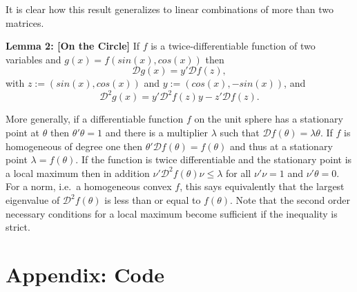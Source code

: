 \documentclass[
  12pt,
]{article}
\begin{document}
It is clear how this result generalizes to linear combinations of more than two matrices.

\textbf{Lemma 2: {[}On the Circle{]}} If \(f\) is a twice-differentiable function of two variables and \(g(x)=f(sin(x),cos(x))\) then
\[
\mathcal{D}g(x)=y'\mathcal{D}f(z),
\]
with \(z:=(sin(x),cos(x))\) and \(y:=(cos(x),-sin(x))\), and
\[
\mathcal{D}^2g(x)=y'\mathcal{D}^2f(z)y-z'\mathcal{D}f(z).
\]

More generally, if a differentiable function \(f\) on the unit sphere has a stationary point at \(\theta\) then \(\theta'\theta=1\) and there is a multiplier \(\lambda\) such that \(\mathcal{D}f(\theta)=\lambda\theta\). If \(f\) is homogeneous of degree one then \(\theta'\mathcal{D}f(\theta)=f(\theta)\) and thus at a stationary point \(\lambda=f(\theta)\). If the function is twice differentiable and the stationary point is a local maximum then in addition \(\nu'\mathcal{D}^2f(\theta)\nu\leq\lambda\) for all \(\nu'\nu=1\) and \(\nu'\theta=0\). For a norm, i.e.~a homogeneous convex \(f\), this says equivalently that the largest eigenvalue of \(\mathcal{D}^2f(\theta)\) is less than or equal to \(f(\theta)\). Note that the second order necessary conditions for a local maximum become sufficient if the inequality is strict.

\section{Appendix: Code}\label{appendix-code}
\end{document}
